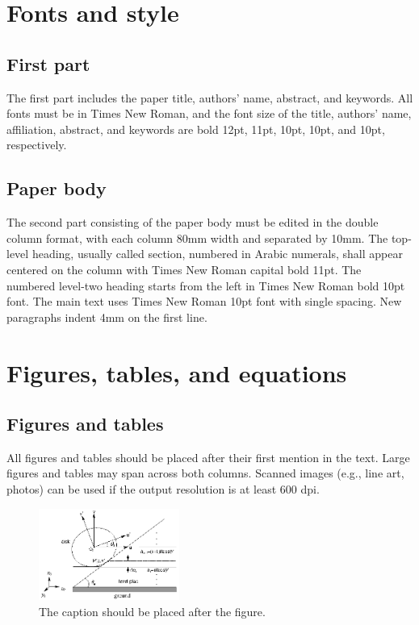 \documentclass[fleqn,10pt,twocolumn]{ICCAS2018}
\begin{document}
\section{Fonts and style}

\subsection{First part}
The first part includes the paper title, authors' name, abstract,
and keywords. All fonts must be in Times New Roman, and the font
size of the title, authors' name, affiliation, abstract, and
keywords are bold 12pt, 11pt, 10pt, 10pt, and 10pt, respectively.

\subsection{Paper body}
The second part consisting of the paper body must be edited in the
double column format, with each column 80mm width and separated by
10mm. The top-level heading, usually called section, numbered in
Arabic numerals, shall appear centered on the column with Times New
Roman capital bold 11pt. The numbered level-two heading starts from
the left in Times New Roman bold 10pt font. The main text uses Times
New Roman 10pt font with single spacing. New paragraphs indent 4mm
on the first line.

\section{Figures, tables, and equations}

\subsection{Figures and tables}
All figures and tables should be placed after their first mention in the text. Large
figures and tables may span across both columns. Scanned images (e.g., line art, photos)
can be used if the output resolution is at least 600 dpi.

\begin{figure}[thb]
\begin{center}
\includegraphics[height=3cm]{test.eps}
\caption{\label{test}The caption should be placed after the figure.}
\end{center}
\end{figure}
\end{document}
